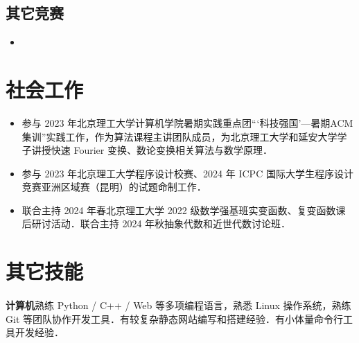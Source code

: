 \documentclass{resume}
\begin{document}
\subsection{\textbf{其它竞赛}}

\begin{itemize}
\item {}
\end{itemize}

\section{社会工作}

\begin{itemize}
    \item 参与 2023 年北京理工大学计算机学院暑期实践重点团“‘科技强国’—暑期ACM集训”实践工作，作为算法课程主讲团队成员，为北京理工大学和延安大学学子讲授快速 Fourier 变换、数论变换相关算法与数学原理．
\end{itemize}


\begin{itemize}
    \item 参与 2023 年北京理工大学程序设计校赛、2024 年 ICPC 国际大学生程序设计竞赛亚洲区域赛（昆明）的试题命制工作．
\end{itemize}

\begin{itemize}
    \item 联合主持 2024 年春北京理工大学 2022 级数学强基班实变函数、复变函数课后研讨活动．联合主持 2024 年秋抽象代数和近世代数讨论班．
\end{itemize}

\section{其它技能}
\paragraph{}{\textbf{计算机}\quad 熟练 Python / C++ / Web 等多项编程语言，熟悉 Linux 操作系统，熟练 Git 等团队协作开发工具．有较复杂静态网站编写和搭建经验．有小体量命令行工具开发经验．}
\end{document}
